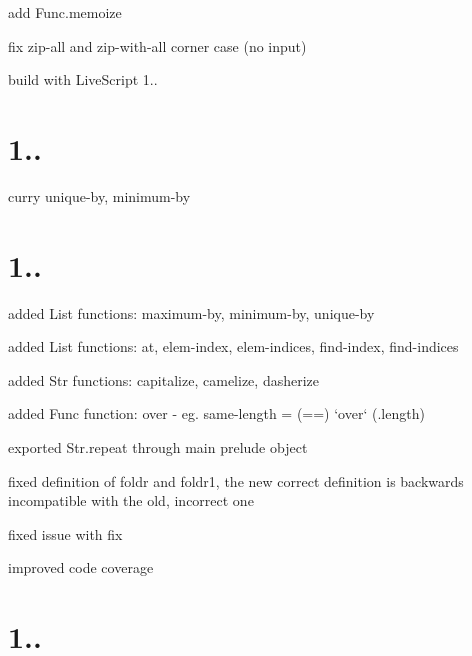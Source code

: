 
\begin{DoxyItemize}
\item add {\ttfamily Func.\+memoize}
\item fix {\ttfamily zip-\/all} and {\ttfamily zip-\/with-\/all} corner case (no input)
\item build with Live\+Script 1..
\end{DoxyItemize}

\section*{1..}


\begin{DoxyItemize}
\item curry {\ttfamily unique-\/by}, {\ttfamily minimum-\/by}
\end{DoxyItemize}

\section*{1..}


\begin{DoxyItemize}
\item added {\ttfamily List} functions\+: {\ttfamily maximum-\/by}, {\ttfamily minimum-\/by}, {\ttfamily unique-\/by}
\item added {\ttfamily List} functions\+: {\ttfamily at}, {\ttfamily elem-\/index}, {\ttfamily elem-\/indices}, {\ttfamily find-\/index}, {\ttfamily find-\/indices}
\item added {\ttfamily Str} functions\+: {\ttfamily capitalize}, {\ttfamily camelize}, {\ttfamily dasherize}
\item added {\ttfamily Func} function\+: {\ttfamily over} -\/ eg. {\ttfamily same-\/length = (==) `over` (.length)}
\item exported {\ttfamily Str.\+repeat} through main {\ttfamily prelude} object
\item fixed definition of {\ttfamily foldr} and {\ttfamily foldr1}, the new correct definition is backwards incompatible with the old, incorrect one
\item fixed issue with {\ttfamily fix}
\item improved code coverage
\end{DoxyItemize}

\section*{1..}



